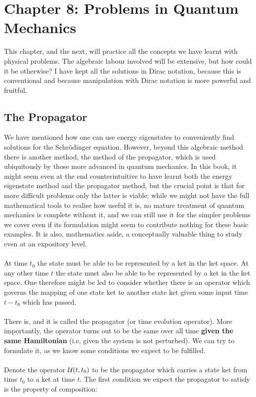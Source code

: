 \chapter{Chapter 8: Problems in Quantum Mechanics}
This chapter, and the next, will practice all the concepts we have learnt with physical problems. The algebraic labour involved will be extensive, but how could it be otherwise? I have kept all the solutions in Dirac notation, because this is conventional and because manipulation with Dirac notation is more powerful and fruitful. 
\section{The Propagator}
We have mentioned how one can use energy eigenstates to conveniently find solutions for the Schr\"{o}dinger equation. However, beyond this algebraic method there is another method, the method of the propagator, which is used ubiquitously by those more advanced in quantum mechanics. In this book, it might seem even at the end counterintuitive to have learnt both the energy eigenstate method and the propagator method, but the crucial point is that for more difficult problems only the latter is viable; while we might not have the full mathematical tools to realise how useful it is, no mature treatment of quantum mechanics is complete without it, and we can still use it for the simpler problems we cover even if its formulation might seem to contribute nothing for these basic examples. It is also, mathematics aside, a conceptually valuable thing to study even at an expository level.
\\\\
At time $t_{0}$ the state must be able to be represented by a ket in the ket space. At any other time $t$ the state must also be able to be represented by a ket in the ket space. One therefore might be led to consider whether there is an operator which governs the mapping of one state ket to another state ket given some input time $t-t_{0}$ which has passed.
\\\\
There is, and it is called the propagator (or time evolution operator). More importantly, the operator turns out to be the same over all time \textbf{given the same Hamiltonian} (i.e, given the system is not perturbed). We can try to formulate it, as we know some conditions we expect to be fulfilled.
\\\\
Denote the operator $\mathcal{U}(t,t_{0})$ to be the propagator which carries a state ket from time $t_{0}$ to a ket at time $t$. The first condition we expect the propagator to satisfy is the property of composition:
